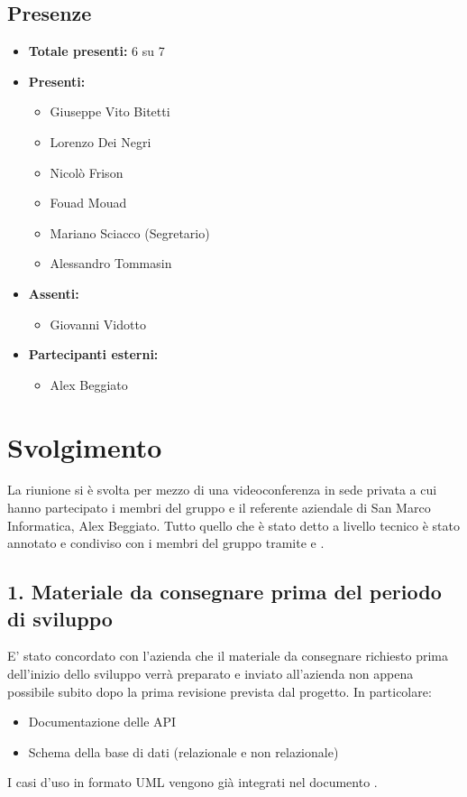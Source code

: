 \subsection*{Presenze}
	\begin{itemize}
		\item \textbf{Totale presenti:} 6 su 7
		\item \textbf{Presenti: }
			\begin{itemize}			
				\item Giuseppe Vito Bitetti
				\item Lorenzo Dei Negri
				\item Nicolò Frison
				\item Fouad Mouad
				\item Mariano Sciacco (Segretario)
				\item Alessandro Tommasin
			\end{itemize}
		\item \textbf{Assenti: } 
			\begin{itemize}	
				\item Giovanni Vidotto
			\end{itemize}
		\item \textbf{Partecipanti esterni:}
			\begin{itemize}
				\item Alex Beggiato
			\end{itemize}
	\end{itemize}


\newpage
\section*{Svolgimento}

	La riunione si è svolta per mezzo di una videoconferenza in sede privata a cui hanno partecipato i membri del gruppo e il referente aziendale di San Marco Informatica, Alex Beggiato. Tutto quello che è stato detto a livello tecnico è stato annotato e condiviso con i membri del gruppo tramite  e .

	\subsection*{1. Materiale da consegnare prima del periodo di sviluppo}

	E' stato concordato con l'azienda che il materiale da consegnare richiesto prima dell'inizio dello sviluppo verrà preparato e inviato all'azienda non appena possibile subito dopo la prima revisione prevista dal progetto. In particolare:
	\begin{itemize}
		\item Documentazione delle API
		\item Schema della base di dati (relazionale e non relazionale)
	\end{itemize}
	I casi d'uso in formato UML vengono già integrati nel documento .

